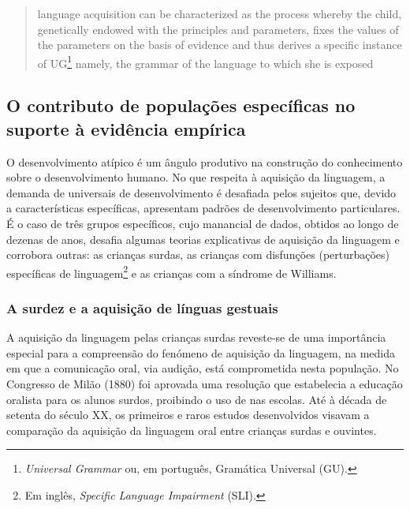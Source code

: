 \documentclass[output=paper]{LSP/langsci}
\begin{document}
\begin{quote}
language acquisition can be characterized as the process whereby the child, genetically endowed with the principles and parameters, fixes the values of the parameters on the basis of evidence and thus derives a specific instance of UG\footnote{\emph{Universal Grammar} ou, em português, Gramática Universal (GU).} namely, the grammar of the language to which she is exposed \citep[262]{jakubowicz1996}
\end{quote}

\subsection{O contributo de populações específicas no suporte à evidência empírica}
\label{subsec:simsim_contributo}

O desenvolvimento atípico é um ângulo produtivo na construção do conhecimento sobre o desenvolvimento humano. No que respeita à aquisição da linguagem, a demanda de universais de desenvolvimento é desafiada pelos sujeitos que, devido a características específicas, apresentam padrões de desenvolvimento particulares. É o caso de três grupos específicos, cujo manancial de dados, obtidos ao longo de dezenas de anos, desafia algumas teorias explicativas de aquisição da linguagem e corrobora outras: as crianças surdas, as crianças com disfunções (perturbações) específicas de linguagem\footnote{Em inglês, \emph{Specific Language Impairment} (SLI).} e as crianças com a síndrome de Williams.

\subsubsection{A surdez e a aquisição de línguas gestuais}
\label{subsubsec:simsim_surdez}
A aquisição da linguagem pelas crianças surdas reveste-se de uma importância especial para a compreensão do fenómeno de aquisição da linguagem, na medida em que a comunicação oral, via audição, está comprometida nesta população. No Congresso de Milão (1880) foi aprovada uma resolução que estabelecia a educação oralista para os alunos surdos, proibindo o uso de  nas escolas. Até à década de setenta do século XX, os primeiros e raros estudos desenvolvidos visavam a comparação da aquisição da linguagem oral entre crianças surdas e ouvintes.
\end{document}
